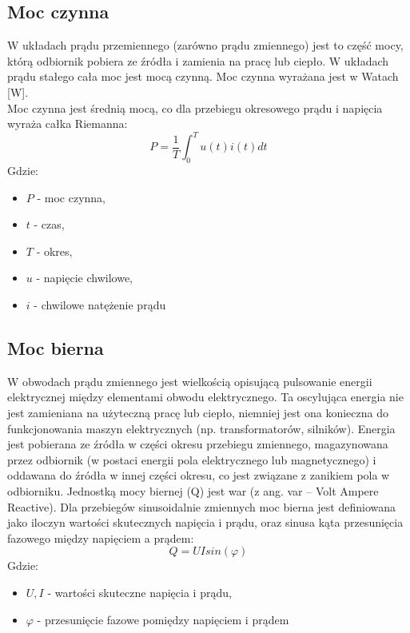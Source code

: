 \documentclass[12pt]{article}
\begin{document}
\subsection{Moc czynna}
 W układach prądu przemiennego (zarówno prądu zmiennego) jest to część mocy, którą odbiornik pobiera ze źródła i zamienia na pracę lub ciepło. W układach prądu stałego cała moc jest mocą czynną. Moc czynna wyrażana jest w Watach [W].\\
 Moc czynna jest średnią mocą, co dla przebiegu okresowego prądu i napięcia wyraża całka Riemanna:
\begin{equation}
 P={\frac {1}{T}}\int _{0}^{T}u(t)i(t)dt
 \end{equation}
 Gdzie:
 \begin{itemize}[noitemsep]
     \item $P$ - moc czynna,
     \item $t$ - czas,
     \item $T$ - okres,
     \item $u$ - napięcie chwilowe,
     \item $i$ - chwilowe natężenie prądu
 \end{itemize}
\subsection{Moc bierna}
W obwodach prądu zmiennego jest wielkością opisującą pulsowanie energii elektrycznej między elementami obwodu elektrycznego. Ta oscylująca energia nie jest zamieniana na użyteczną pracę lub ciepło, niemniej jest ona konieczna do funkcjonowania maszyn elektrycznych (np. transformatorów, silników). Energia jest pobierana ze źródła w części okresu przebiegu zmiennego, magazynowana przez odbiornik (w postaci energii pola elektrycznego lub magnetycznego) i oddawana do źródła w innej części okresu, co jest związane z zanikiem pola w odbiorniku. Jednostką mocy biernej (Q) jest war (z ang. var – Volt Ampere Reactive).
Dla przebiegów sinusoidalnie zmiennych moc bierna jest definiowana jako iloczyn wartości skutecznych napięcia i prądu, oraz sinusa kąta przesunięcia fazowego między napięciem a prądem:
\begin{equation}
    Q = UIsin(\varphi)
\end{equation}
Gdzie:
\begin{itemize}[noitemsep]
    \item $U, I$ - wartości skuteczne napięcia i prądu,
    \item $\varphi$ - przesunięcie fazowe pomiędzy napięciem i prądem
\end{itemize}
\end{document}
